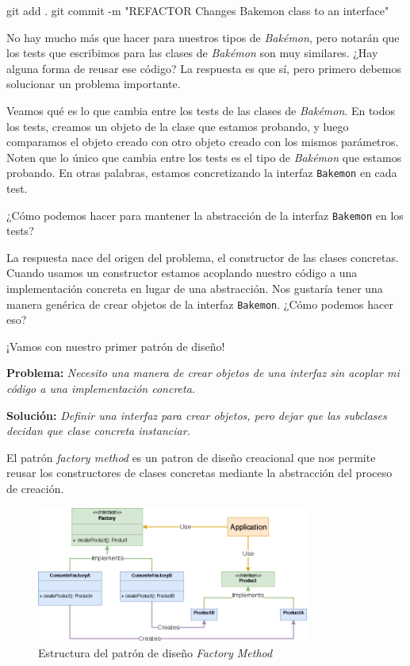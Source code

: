   \begin{powershell}
    git add .
    git commit -m "REFACTOR Changes Bakemon class to an interface"
  \end{powershell}

  No hay mucho más que hacer para nuestros tipos de \textit{Bakémon}, pero notarán que los tests que
  escribimos para las clases de \textit{Bakémon} son muy similares.
  ¿Hay alguna forma de reusar ese código?
  La respuesta es que sí, pero primero debemos solucionar un problema importante.

  Veamos qué es lo que cambia entre los tests de las clases de \textit{Bakémon}.
  En todos los tests, creamos un objeto de la clase que estamos probando, y luego comparamos
  el objeto creado con otro objeto creado con los mismos parámetros.
  Noten que lo único que cambia entre los tests es el tipo de \textit{Bakémon} que estamos
  probando.
  En otras palabras, estamos concretizando la interfaz \texttt{Bakemon} en cada test.

  ¿Cómo podemos hacer para mantener la abstracción de la interfaz \texttt{Bakemon} en los tests?

  La respuesta nace del origen del problema, el constructor de las clases concretas.
  Cuando usamos un constructor estamos acoplando nuestro código a una implementación concreta en
  lugar de una abstracción.
  Nos gustaría tener una manera genérica de crear objetos de la interfaz \texttt{Bakemon}.
  ¿Cómo podemos hacer eso?

  ¡Vamos con nuestro primer patrón de diseño!

  \begin{defaultbox}
    \textbf{Problema:} \textit{Necesito una manera de crear objetos de una interfaz sin acoplar
    mi código a una implementación concreta.}

    \textbf{Solución:} \textit{Definir una interfaz para crear objetos, pero dejar que las
    subclases decidan que clase concreta instanciar.}
  \end{defaultbox}

  El patrón \textit{factory method} es un patron de diseño creacional que nos permite reusar los constructores de clases concretas mediante la
  abstracción del proceso de creación.

  \begin{figure}[ht!]
    \centering
    \includegraphics[width=0.8\textwidth]{img/oop/factory/abstract_factory.png}
    \caption{Estructura del patrón de diseño \textit{Factory Method}}
    \label{fig:abstract_factory}
  \end{figure}

